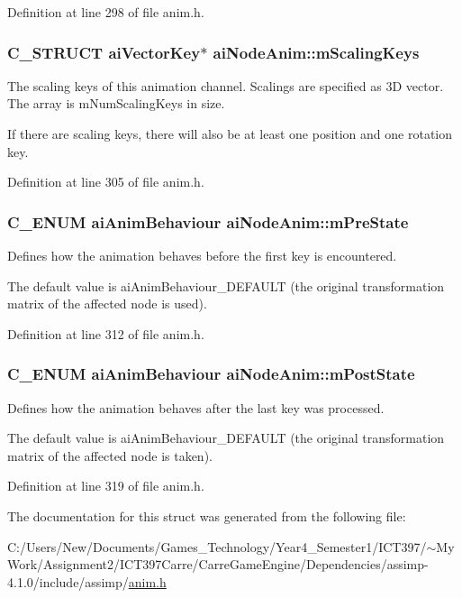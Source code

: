 Definition at line 298 of file anim.h.\hypertarget{structai_node_anim_4588122722d5148d6e590da820bdf35f}{
\subsubsection[mScalingKeys]{\setlength{\rightskip}{0pt plus 5cm}C\_\-STRUCT {\bf aiVectorKey}$\ast$ {\bf aiNodeAnim::mScalingKeys}}}
\label{structai_node_anim_4588122722d5148d6e590da820bdf35f}


The scaling keys of this animation channel. Scalings are specified as 3D vector. The array is mNumScalingKeys in size.

If there are scaling keys, there will also be at least one position and one rotation key. 

Definition at line 305 of file anim.h.\hypertarget{structai_node_anim_305c01b60886a07b69f04b1db6d7d3c5}{
\subsubsection[mPreState]{\setlength{\rightskip}{0pt plus 5cm}C\_\-ENUM {\bf aiAnimBehaviour} {\bf aiNodeAnim::mPreState}}}
\label{structai_node_anim_305c01b60886a07b69f04b1db6d7d3c5}


Defines how the animation behaves before the first key is encountered.

The default value is aiAnimBehaviour\_\-DEFAULT (the original transformation matrix of the affected node is used). 

Definition at line 312 of file anim.h.\hypertarget{structai_node_anim_93cefd440cbaf587c136eb224d4a0327}{
\subsubsection[mPostState]{\setlength{\rightskip}{0pt plus 5cm}C\_\-ENUM {\bf aiAnimBehaviour} {\bf aiNodeAnim::mPostState}}}
\label{structai_node_anim_93cefd440cbaf587c136eb224d4a0327}


Defines how the animation behaves after the last key was processed.

The default value is aiAnimBehaviour\_\-DEFAULT (the original transformation matrix of the affected node is taken). 

Definition at line 319 of file anim.h.

The documentation for this struct was generated from the following file:\begin{CompactItemize}
\item 
C:/Users/New/Documents/Games\_\-Technology/Year4\_\-Semester1/ICT397/$\sim$My Work/Assignment2/ICT397Carre/CarreGameEngine/Dependencies/assimp-4.1.0/include/assimp/\hyperlink{anim_8h}{anim.h}\end{CompactItemize}
